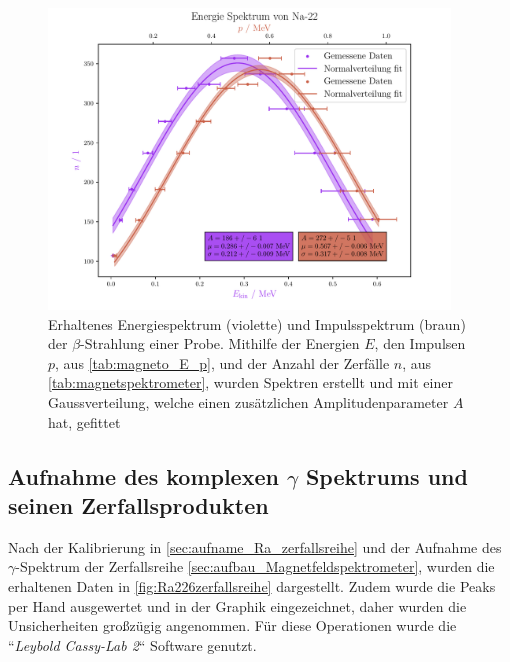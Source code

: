 \documentclass[12pt,english,ngerman]{scrartcl}
\begin{document}
\begin{figure}[H]
	\begin{center}
		\includegraphics[width = 0.95\textwidth]{figures/energiespektrum.pdf}
	\end{center}
	\caption[Energie- und Impulsspektogram der $\beta$-Strahlung einer 
		Probe]{
		Erhaltenes Energiespektrum (violette) und Impulsspektrum (braun) der
		$\beta$-Strahlung einer  Probe. Mithilfe der Energien $E$, den
		Impulsen $p$, aus \autoref{tab:magneto_E_p}, und der Anzahl der Zerfälle $n$,
		aus \autoref{tab:magnetspektrometer}, wurden Spektren erstellt und mit einer
		Gaussverteilung, welche einen zusätzlichen Amplitudenparameter $A$ hat,
		gefittet
	}\label{fig:magneto_E_p}
\end{figure}

\subsection{Aufnahme des komplexen \texorpdfstring{$\gamma$}{gamma} Spektrums
	und seinen Zerfallsprodukten}

Nach der Kalibrierung in \autoref{sec:aufname_Ra_zerfallsreihe} und der
Aufnahme des \(\gamma\)-Spektrum der  Zerfallsreihe
\autoref{sec:aufbau_Magnetfeldspektrometer}, wurden die erhaltenen Daten in
\autoref{fig:Ra226zerfallsreihe} dargestellt. Zudem wurde die Peaks per Hand
ausgewertet und in der Graphik eingezeichnet, daher wurden die Unsicherheiten
großzügig angenommen. Für diese Operationen wurde die ``\emph{Leybold Cassy-Lab
	2}`` Software genutzt.
\end{document}
